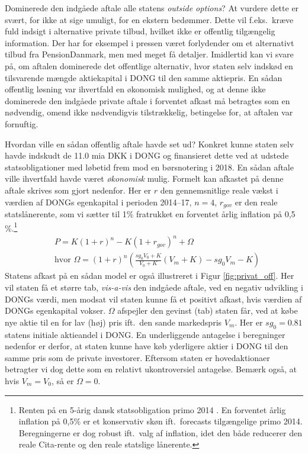 \documentclass{article}
\begin{document}
Dominerede den indgåede aftale alle statens \emph{outside options}? At vurdere dette er svært, for ikke at sige umuligt, for en ekstern bedømmer. Dette vil f.eks.\ kræve fuld indsigt i alternative private tilbud, hvilket ikke er offentlig tilgængelig information. Der har for eksempel i pressen været forlydender om et alternativt tilbud fra PensionDanmark, men med meget få detaljer. Imidlertid kan vi svare på, om aftalen dominerede det offentlige alternativ, hvor staten selv indskød en tilsvarende mængde aktiekapital i DONG til den samme aktiepris. En sådan offentlig løsning var ihvertfald en økonomisk mulighed, og at denne ikke dominerede den indgåede private aftale i forventet afkast må betragtes som en nødvendig, omend ikke nødvendigvis tilstrækkelig, betingelse for, at aftalen var fornuftig. 

Hvordan ville en sådan offentlig aftale havde set ud? Konkret kunne staten selv havde indskudt de 11.0 mia DKK i DONG og finansieret dette ved at udstede statsobligationer med løbetid frem mod en børsnotering i 2018. En sådan aftale ville ihvertfald havde været \emph{økonomisk} mulig. Formelt kan afkastet på denne aftale skrives som gjort nedenfor. Her er $r$ den gennemsnitlige reale vækst i værdien af DONGs egenkapital i perioden 2014--17, $n=4$, $r_{\mathit{gov}}$ er den reale statslånerente, som vi sætter til 1\% fratrukket en forventet årlig inflation på 0,5 \%.\footnote{Renten på en 5-årig dansk statsobligation primo 2014 \citep{NB2014}. En forventet årlig inflation på 0,5\% er et konservativ skøn ift.\ forecasts tilgængelige primo 2014. Beregningerne er dog robust ift.\ valg af inflation, idet den både reducerer den reale Cita-rente og den reale statslige lånerente.}
\begin{align}
&P=K(1+r)^n-K(1+r_{gov})^n +\Omega \\
&\text{hvor } \Omega=(1+r)^n\left( \frac{sg_0 V_0+K}{V_0+K} \left( V_m+K \right)-sg_0 V_m -K\right)\nonumber
\label{eq:gov_capital}
\end{align}
Statens afkast på en sådan model er også illustreret i Figur \ref{fig:privat_off}. Her vil staten få et større tab, \emph{vis-a-vis} den indgåede aftale, ved en negativ udvikling i DONGs værdi, men modsat vil staten kunne få et positivt afkast, hvis værdien af DONGs egenkapital vokser. $\Omega$ afspejler den gevinst (tab) staten får, ved at købe nye aktie til en for lav (høj) pris ift.\ den sande markedspris $V_m$. Her er $sg_0=0.81$ statens initiale aktieandel i DONG. En underliggende antagelse i beregninger nedenfor er derfor, at staten kunne have køb yderligere aktier i DONG til den samme pris som de private investorer. Eftersom staten er hovedaktionaer betragter vi dog dette som en relativt ukontroversiel antagelse. Bemærk også, at hvis $V_m=V_0$, så er $\Omega=0$.
\end{document}
